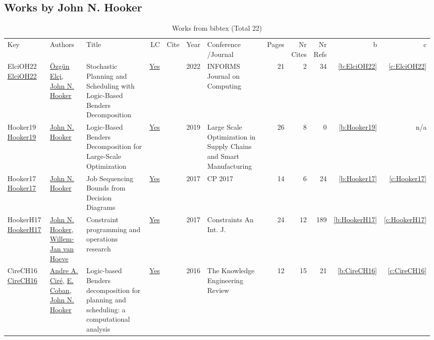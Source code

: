 \subsection{Works by John N. Hooker}
\label{sec:a162}
{\scriptsize
\begin{longtable}{>{\raggedright\arraybackslash}p{3cm}>{\raggedright\arraybackslash}p{6cm}>{\raggedright\arraybackslash}p{6.5cm}rrrp{2.5cm}rrrrr}
\rowcolor{white}\caption{Works from bibtex (Total 22)}\\ \toprule
\rowcolor{white}Key & Authors & Title & LC & Cite & Year & \shortstack{Conference\\/Journal} & Pages & \shortstack{Nr\\Cites} & \shortstack{Nr\\Refs} & b & c \\ \midrule\endhead
\bottomrule
\endfoot
ElciOH22 \href{http://dx.doi.org/10.1287/ijoc.2022.1184}{ElciOH22} & \hyperref[auth:a952]{\"{O}zg\"{u}n El\c{c}i}, \hyperref[auth:a162]{John N. Hooker} & Stochastic Planning and Scheduling with Logic-Based Benders Decomposition & \href{works/ElciOH22.pdf}{Yes} & \cite{ElciOH22} & 2022 & INFORMS Journal on Computing & 21 & 2 & 34 & \ref{b:ElciOH22} & \ref{c:ElciOH22}\\
Hooker19 \href{http://dx.doi.org/10.1007/978-3-030-22788-3_1}{Hooker19} & \hyperref[auth:a162]{John N. Hooker} & {Logic-Based Benders Decomposition for Large-Scale Optimization} & \href{works/Hooker19.pdf}{Yes} & \cite{Hooker19} & 2019 & {Large Scale Optimization in Supply Chains and Smart Manufacturing} & 26 & 8 & 0 & \ref{b:Hooker19} & n/a\\
Hooker17 \href{https://doi.org/10.1007/978-3-319-66158-2\_36}{Hooker17} & \hyperref[auth:a162]{John N. Hooker} & Job Sequencing Bounds from Decision Diagrams & \href{works/Hooker17.pdf}{Yes} & \cite{Hooker17} & 2017 & CP 2017 & 14 & 6 & 24 & \ref{b:Hooker17} & \ref{c:Hooker17}\\
HookerH17 \href{http://dx.doi.org/10.1007/s10601-017-9280-3}{HookerH17} & \hyperref[auth:a162]{John N. Hooker}, \hyperref[auth:a845]{Willem-Jan van Hoeve} & Constraint programming and operations research & \href{works/HookerH17.pdf}{Yes} & \cite{HookerH17} & 2017 & Constraints An Int. J. & 24 & 12 & 189 & \ref{b:HookerH17} & \ref{c:HookerH17}\\
CireCH16 \href{http://dx.doi.org/10.1017/s0269888916000254}{CireCH16} & \hyperref[auth:a912]{Andre A. Ciré}, \hyperref[auth:a341]{E. Coban}, \hyperref[auth:a162]{John N. Hooker} & Logic-based Benders decomposition for planning and scheduling: a computational analysis & \href{works/CireCH16.pdf}{Yes} & \cite{CireCH16} & 2016 & The Knowledge Engineering Review & 12 & 15 & 21 & \ref{b:CireCH16} & \ref{c:CireCH16}\\

\end{longtable}}
